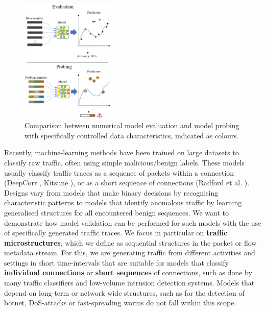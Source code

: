 \documentclass[conference]{IEEEtran}
\begin{document}
\begin{figure}
\centering
\includegraphics[width=0.4\textwidth]{images/Eva_Prob2.png}
\caption{Comparison between numerical model evaluation and model probing with specifically controlled data characteristics, indicated as colours.}\label{fig:Subspace_disp}
\end{figure}

Recently, machine-learning methods have been trained on large datasets to classify raw traffic, often using simple malicious/benign labels. These models usually classify traffic traces as a sequence of packets within a connection (DeepCorr \cite{nasr2018deepcorr}, Kitsune \cite{mirsky2018kitsune}), or as a short sequence of connections (Radford et al. \cite{radford2018network}). Designs vary from models that make binary decisions by recognising characteristic patterns to models that identify anomalous traffic by learning generalised structures for all encountered benign sequences.
We want to demonstrate how model validation can be performed for such models with the use of specifically generated traffic traces. We focus in particular on \textbf{traffic microstructures}, which we define as sequential structures in the packet or flow metadata stream.
For this, we are generating traffic from different activities and settings in short time-intervals that are suitable for models that classify \textbf{individual connections} or \textbf{short sequences} of connections, such as done by many traffic classifiers and low-volume intrusion detection systems. Models that depend on long-term or network wide structures, such as for the detection of botnet, DoS-attacks or fast-spreading worms do not fall within this scope.

\end{document}
